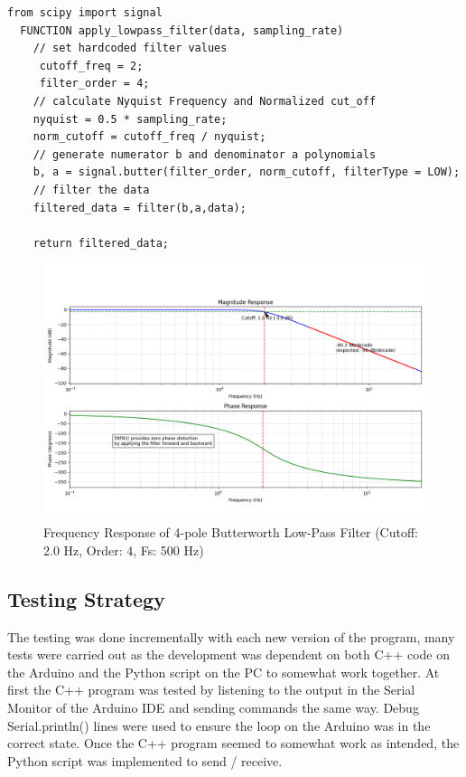 \begin{lstlisting}[style=cstyle, caption=Python apply\_lowpass\_filter() PseudoCode, label=lst:pythonLowPassFilter]
  from scipy import signal
  FUNCTION apply_lowpass_filter(data, sampling_rate)
    // set hardcoded filter values
     cutoff_freq = 2;
     filter_order = 4;
    // calculate Nyquist Frequency and Normalized cut_off
    nyquist = 0.5 * sampling_rate;
    norm_cutoff = cutoff_freq / nyquist;
    // generate numerator b and denominator a polynomials 
    b, a = signal.butter(filter_order, norm_cutoff, filterType = LOW);
    // filter the data
    filtered_data = filter(b,a,data);

    return filtered_data;

\end{lstlisting}

\begin{figure}[htbp] 
  \centering
  \includegraphics[width=1\textwidth]{chapters/methodology/ArduinoDAQ/filter_response.png}
  \caption{Frequency Response of 4-pole Butterworth Low-Pass Filter (Cutoff: 2.0 Hz, Order: 4, Fs: 500 Hz)}
  \label{fig:filterResponse}
\end{figure}

\subsection{Testing Strategy}
The testing was done incrementally with each new version of the program, many tests were carried out as the development was dependent on both C++ code on the Arduino and the Python script on the PC to somewhat work together. At first the C++ program was tested by listening to the output in the Serial Monitor of the Arduino IDE and sending commands the same way. Debug Serial.println() lines were used to ensure the loop on the Arduino was in the correct state. Once the C++ program seemed to somewhat work as intended, the Python script was implemented to send / receive. 

